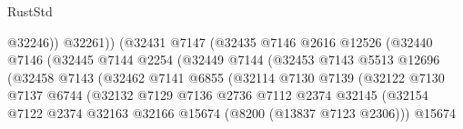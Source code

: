 \begin{lexlean}{RustStd}
\begin{coremodule}
                                            @32246))
                                        @32261))
                                    (@32431
                                      @7147
                                      (@32435
                                        @7146
                                        @2616
                                        @12526
                                        (@32440
                                          @7146
                                          (@32445
                                            @7144
                                            @2254
                                            (@32449
                                              @7144
                                              (@32453
                                                @7143
                                                @5513
                                                @12696
                                                (@32458
                                                  @7143
                                                  (@32462
                                                    @7141
                                                    @6855
                                                    (@32114
                                                      @7130
                                                      @7139
                                                      (@32122
                                                        @7130
                                                        @7137
                                                        @6744
                                                        (@32132
                                                          @7129
                                                          @7136
                                                          @2736
                                                          @7112
                                                          @2374
                                                          @32145
                                                          (@32154
                                                            @7122
                                                            @2374
                                                            @32163
                                                            @32166
                                                            @15674
                                                            (@8200 (@13837 @7123 @2306)))
                                                          @15674

\end{coremodule}
\end{lexlean}
